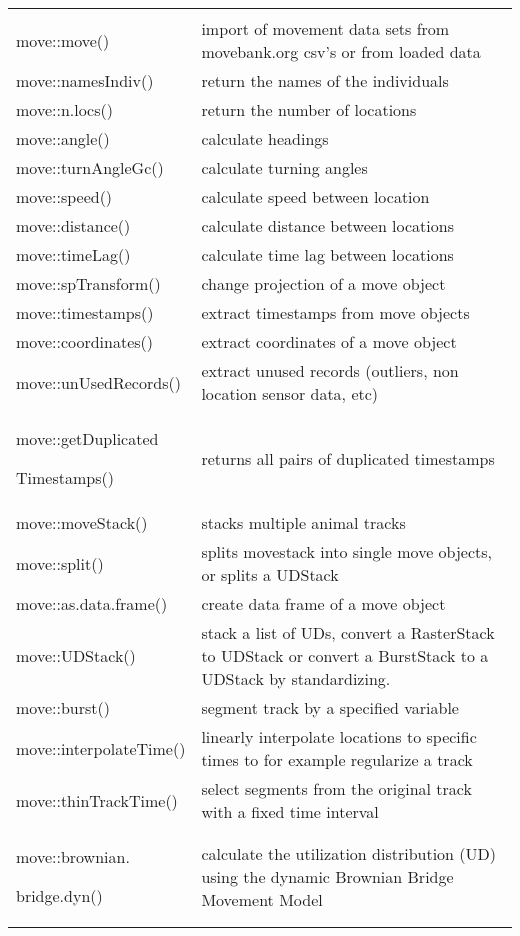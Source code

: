 \documentclass[a4paper,10pt,landscape]{article}
\begin{document}
\begin{multicols}{3}
\begin{tabular}{@{}p{\the\MyLen}%
                @{}p{\linewidth-\the\MyLen}@{}}
                & \\
move::move() & import of movement data sets from movebank.org csv's or from loaded data \\
move::namesIndiv() & return the names of the individuals \\
move::n.locs() & return the number of locations \\
move::angle() &  calculate headings\\
move::turnAngleGc() & calculate turning angles\\
move::speed() & calculate speed between location \\  
move::distance() & calculate distance between locations \\
move::timeLag() & calculate time lag between locations \\
move::spTransform() & change projection of a move object\\
move::timestamps() & extract timestamps from move objects\\
move::coordinates() & extract coordinates of a move object\\
move::unUsedRecords() & extract unused records (outliers, non location sensor data, etc)\\
move::getDuplicated\par
Timestamps() & returns all pairs of duplicated timestamps\\
move::moveStack() & stacks multiple animal tracks \\
move::split() & splits movestack into single move objects, or splits a UDStack\\
move::as.data.frame() & create data frame of a move object\\
move::UDStack() & stack a list of UDs, convert a RasterStack to UDStack or convert a BurstStack to a UDStack by standardizing.\\
move::burst() & segment track by a specified variable \\
move::interpolateTime() & linearly interpolate locations to specific times to for example regularize a track \\
move::thinTrackTime() & select segments from the original track with a fixed time interval \\
move::brownian.\par
bridge.dyn() & calculate the utilization distribution (UD) using the dynamic Brownian Bridge Movement Model\\

\end{tabular}
\end{multicols}
\end{document}
